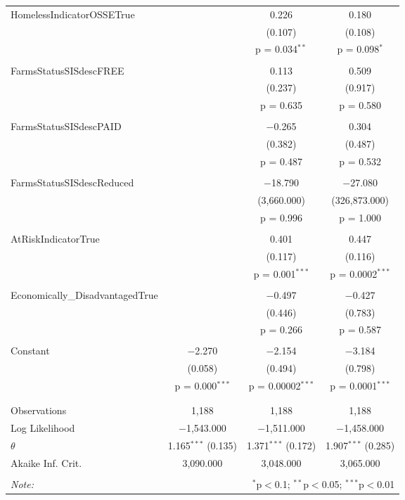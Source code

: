 \begin{table}[!htbp]
\begin{tabular}{@{\extracolsep{5pt}}lccc}
 HomelessIndicatorOSSETrue &  & 0.226 & 0.180 \\ 
  &  & (0.107) & (0.108) \\ 
  &  & p = 0.034$^{**}$ & p = 0.098$^{*}$ \\ 
  & & & \\ 
 FarmsStatusSISdescFREE &  & 0.113 & 0.509 \\ 
  &  & (0.237) & (0.917) \\ 
  &  & p = 0.635 & p = 0.580 \\ 
  & & & \\ 
 FarmsStatusSISdescPAID &  & $-$0.265 & 0.304 \\ 
  &  & (0.382) & (0.487) \\ 
  &  & p = 0.487 & p = 0.532 \\ 
  & & & \\ 
 FarmsStatusSISdescReduced &  & $-$18.790 & $-$27.080 \\ 
  &  & (3,660.000) & (326,873.000) \\ 
  &  & p = 0.996 & p = 1.000 \\ 
  & & & \\ 
 AtRiskIndicatorTrue &  & 0.401 & 0.447 \\ 
  &  & (0.117) & (0.116) \\ 
  &  & p = 0.001$^{***}$ & p = 0.0002$^{***}$ \\ 
  & & & \\ 
 Economically\_DisadvantagedTrue &  & $-$0.497 & $-$0.427 \\ 
  &  & (0.446) & (0.783) \\ 
  &  & p = 0.266 & p = 0.587 \\ 
  & & & \\ 
 Constant & $-$2.270 & $-$2.154 & $-$3.184 \\ 
  & (0.058) & (0.494) & (0.798) \\ 
  & p = 0.000$^{***}$ & p = 0.00002$^{***}$ & p = 0.0001$^{***}$ \\ 
  & & & \\ 
\hline \\[-1.8ex] 
Observations & 1,188 & 1,188 & 1,188 \\ 
Log Likelihood & $-$1,543.000 & $-$1,511.000 & $-$1,458.000 \\ 
$\theta$ & 1.165$^{***}$  (0.135) & 1.371$^{***}$  (0.172) & 1.907$^{***}$  (0.285) \\ 
Akaike Inf. Crit. & 3,090.000 & 3,048.000 & 3,065.000 \\ 
\hline 
\hline \\[-1.8ex] 
\textit{Note:}  & \multicolumn{3}{r}{$^{*}$p$<$0.1; $^{**}$p$<$0.05; $^{***}$p$<$0.01} \\ 
\end{tabular} 
\end{table} 
